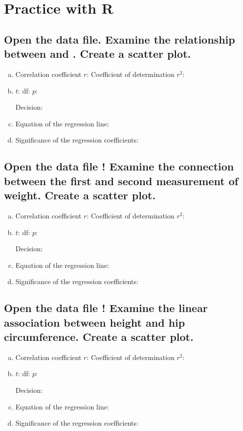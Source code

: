 \section{Practice with R}
\subsection{Open the \quest data file. Examine the relationship between  and . Create a scatter plot. }
\begin{enumerate}[a)]
\item Correlation coefficient $r$: \hrulefill\quad	 Coefficient of determination $r^2$:	 \hrulefill
\item %
%
	 $t$: \hrulefill\quad	 df: \hrulefill\quad $p$:	 \hrulefill

 Decision: \hrulefill
\item Equation of the regression line: \hrulefill
\item Significance of the regression coefficients: \hrulefill
\end{enumerate}

\subsection{Open the data file ! Examine the connection between the first and second measurement of weight. Create a scatter plot.}
\begin{enumerate}[a)]
\item Correlation coefficient $r$: \hrulefill\quad	 Coefficient of determination $r^2$:	 \hrulefill
\item %
$t$: \hrulefill\quad	 df: \hrulefill\quad $p$:	 \hrulefill

 Decision: \hrulefill
\item Equation of the regression line: \hrulefill
\item Significance of the regression coefficients: \hrulefill
\end{enumerate}

\subsection{ Open the data file ! Examine the linear association between height and hip circumference. Create a scatter plot.}
\begin{enumerate}[a)]
\item Correlation coefficient $r$: \hrulefill\quad	 Coefficient of determination $r^2$:	 \hrulefill
\item %
%
	 $t$: \hrulefill\quad	 df: \hrulefill\quad $p$:	 \hrulefill

 Decision: \hrulefill
\item Equation of the regression line: \hrulefill
\item Significance of the regression coefficients: \hrulefill
\end{enumerate}
